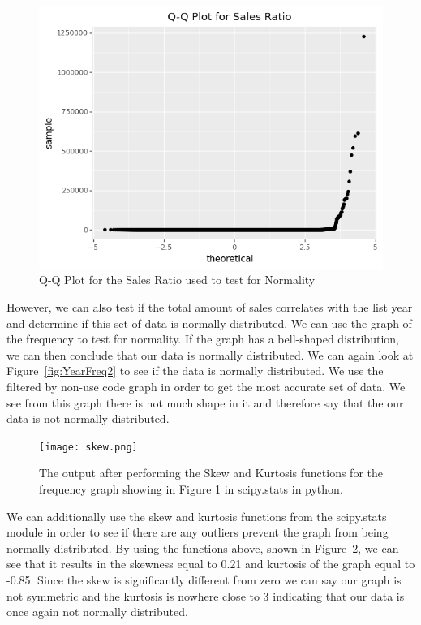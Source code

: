 \documentclass[12pt]{article}
\begin{document}
\begin{figure}[!t]
  \centering
  \includegraphics[width=\textwidth]{q-q plot.png}
  \caption{Q-Q Plot for the Sales Ratio used to test for Normality}
  \label{fig:qqplot}
\end{figure}

However, we can also test if the total amount of sales correlates with the list year and determine if this set of data is normally distributed. We can use the graph of the frequency to test for normality. If the graph has a bell-shaped distribution, we can then conclude that our data is normally distributed. We can again look at Figure~\ref{fig:YearFreq2} to see if the data is normally distributed. We use the filtered by non-use code graph in order to get the most accurate set of data. We see from this graph there is not much shape in it and therefore say that the our data is not normally distributed.


\begin{figure}[!t]
  \centering
  \texttt{[image: skew.png]}
  \caption{The output after performing the Skew and Kurtosis functions for the frequency graph showing in Figure 1 in scipy.stats in python.}
  \label{fig:SkewKurtosis}
\end{figure}

We can additionally use the skew and kurtosis functions from the scipy.stats module in order to see if there are any outliers prevent the graph from being normally distributed. By using the functions above, shown in Figure~\ref{fig:SkewKurtosis}, we can see that it results in the skewness equal to 0.21 and kurtosis of the graph equal to -0.85. Since the skew is significantly different from zero we can say our graph is not symmetric and the kurtosis is nowhere close to 3 indicating that our data is once again not normally distributed. 
\end{document}

